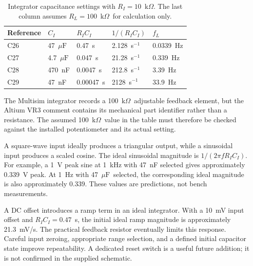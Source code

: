 \documentclass[11pt,a4paper]{article}
\newcommand{\kohm}{\ensuremath{\mathrm{k}\Omega}}
\newcommand{\uF}{\ensuremath{\mu\mathrm{F}}}
\begin{document}
\begin{table}[htbp]
\centering\small
\caption{Integrator capacitance settings with $R_I=10$~\kohm. The last column assumes $R_L=100$~\kohm\ for calculation only.}
\begin{tabular}{lllll}
\toprule
\textbf{Reference} & \boldmath$C_I$ & \boldmath$R_IC_I$ & \boldmath$1/(R_IC_I)$ & \boldmath$f_L$\\
\midrule
C26 & 47~\uF & 0.47~s & 2.128~s$^{-1}$ & 0.0339~Hz\\
C27 & 4.7~\uF & 0.047~s & 21.28~s$^{-1}$ & 0.339~Hz\\
C28 & 470~nF & 0.0047~s & 212.8~s$^{-1}$ & 3.39~Hz\\
C29 & 47~nF & 0.00047~s & 2128~s$^{-1}$ & 33.9~Hz\\
\bottomrule
\end{tabular}
\end{table}

The Multisim integrator records a 100~\kohm\ adjustable feedback element, but the Altium VR3 comment contains its mechanical part identifier rather than a resistance. The assumed 100~\kohm\ value in the table must therefore be checked against the installed potentiometer and its actual setting.

A square-wave input ideally produces a triangular output, while a sinusoidal input produces a scaled cosine. The ideal sinusoidal magnitude is $1/(2\pi fR_IC_I)$. For example, a 1~V peak sine at 1~kHz with 47~nF selected gives approximately 0.339~V peak. At 1~Hz with 47~\uF\ selected, the corresponding ideal magnitude is also approximately 0.339. These values are predictions, not bench measurements.

A DC offset introduces a ramp term in an ideal integrator. With a 10~mV input offset and $R_IC_I=0.47$~s, the initial ideal ramp magnitude is approximately 21.3~mV/s. The practical feedback resistor eventually limits this response. Careful input zeroing, appropriate range selection, and a defined initial capacitor state improve repeatability. A dedicated reset switch is a useful future addition; it is not confirmed in the supplied schematic.

\end{document}
